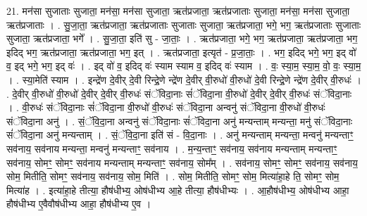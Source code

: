 \documentclass[17pt]{extarticle}
\begin{document}
21. मन॑सा सुजाताः सुजाता॒ मन॑सा॒ मन॑सा सुजाता॒ ऋत॑प्रजाता॒ ऋत॑प्रजाताः सुजाता॒ मन॑सा॒ मन॑सा सुजाता॒ ऋत॑प्रजाताः । . सु॒जा॒ता॒ ऋत॑प्रजाता॒ ऋत॑प्रजाताः सुजाताः सुजाता॒ ऋत॑प्रजाता॒ भगे॒ भग॒ ऋत॑प्रजाताः सुजाताः सुजाता॒ ऋत॑प्रजाता॒ भगे᳚ । . सु॒जा॒ता॒ इति॑ सु - जा॒ताः॒ । . ऋत॑प्रजाता॒ भगे॒ भग॒ ऋत॑प्रजाता॒ ऋत॑प्रजाता॒ भग॒ इदिद् भग॒ ऋत॑प्रजाता॒ ऋत॑प्रजाता॒ भग॒ इत् । . ऋत॑प्रजाता॒ इत्यृत॑ - प्र॒जा॒ताः॒ । . भग॒ इदिद् भगे॒ भग॒ इद् वो॑ व॒ इद् भगे॒ भग॒ इद् वः॑ । . इद् वो॑ व॒ इदिद् वः॑ स्याम स्याम व॒ इदिद् वः॑ स्याम । . वः॒ स्या॒म॒ स्या॒म॒ वो॒ वः॒ स्या॒म॒ । . स्या॒मेति॑ स्याम । . इन्द्रे॑ण दे॒वीर् दे॒वी रिन्द्रे॒णे न्द्रे॑ण दे॒वीर् वी॒रुधो॑ वी॒रुधो॑ दे॒वी रिन्द्रे॒णे न्द्रे॑ण दे॒वीर् वी॒रुधः॑ । . दे॒वीर् वी॒रुधो॑ वी॒रुधो॑ दे॒वीर् दे॒वीर् वी॒रुधः॑ संॅविदा॒नाः सं॑ॅविदा॒ना वी॒रुधो॑ दे॒वीर् दे॒वीर् वी॒रुधः॑ संॅविदा॒नाः । . वी॒रुधः॑ संॅविदा॒नाः सं॑ॅविदा॒ना वी॒रुधो॑ वी॒रुधः॑ संॅविदा॒ना अन्वनु॑ संॅविदा॒ना वी॒रुधो॑ वी॒रुधः॑ संॅविदा॒ना अनु॑ । . सं॒ॅवि॒दा॒ना अन्वनु॑ संॅविदा॒नाः सं॑ॅविदा॒ना अनु॑ मन्यन्ताम् मन्यन्ता॒ मनु॑ संॅविदा॒नाः सं॑ॅविदा॒ना अनु॑ मन्यन्ताम् । . सं॒ॅवि॒दा॒ना इति॑ सं - वि॒दा॒नाः । . अनु॑ मन्यन्ताम् मन्यन्ता॒ मन्वनु॑ मन्यन्ताꣳ॒॒ सव॑नाय॒ सव॑नाय मन्यन्ता॒ मन्वनु॑ मन्यन्ताꣳ॒॒ सव॑नाय । . म॒न्य॒न्ताꣳ॒॒ सव॑नाय॒ सव॑नाय मन्यन्ताम् मन्यन्ताꣳ॒॒ सव॑नाय॒ सोमꣳ॒॒ सोमꣳ॒॒ सव॑नाय मन्यन्ताम् मन्यन्ताꣳ॒॒ सव॑नाय॒ सोम᳚म् । . सव॑नाय॒ सोमꣳ॒॒ सोमꣳ॒॒ सव॑नाय॒ सव॑नाय॒ सोम॒ मितीति॒ सोमꣳ॒॒ सव॑नाय॒ सव॑नाय॒ सोम॒ मिति॑ । . सोम॒ मितीति॒ सोमꣳ॒॒ सोम॒ मित्या॑हा॒हे ति॒ सोमꣳ॒॒ सोम॒ मित्या॑ह । . इत्या॑हा॒हे तीत्या॒ हौष॑धीभ्य॒ ओष॑धीभ्य आ॒हे तीत्या॒ हौष॑धीभ्यः । . आ॒हौष॑धीभ्य॒ ओष॑धीभ्य आहा॒ हौष॑धीभ्य ए॒वैवौष॑धीभ्य आहा॒ हौष॑धीभ्य ए॒व । \newline
\end{document}
